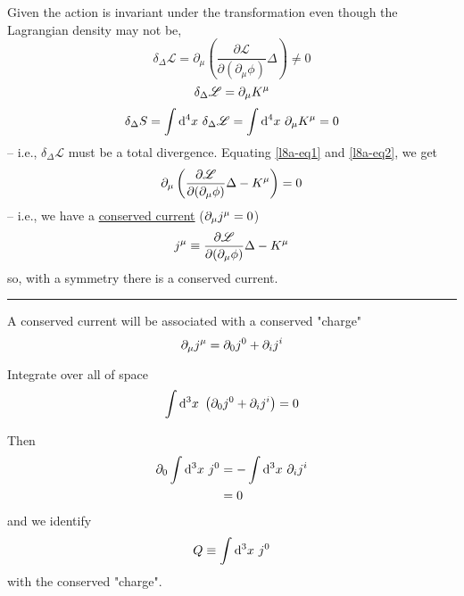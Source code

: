 \documentclass{article}
\begin{document}
\noindent Given the action is invariant under the transformation even though the \linebreak Lagrangian density may not be,
\begin{equation} \label{l8a-eq1}
    \delta_\Delta \mathscr{L} = \partial_\mu \left( \dfrac{ \partial \mathscr{L} }{ \partial ( \partial_\mu \phi ) } \Delta \right) \neq 0
\end{equation} %
\begin{equation} \label{l8a-eq2}
    \delta_\Delta \mathscr{L} = \partial_\mu \tensor{K}{^\mu}
\end{equation} %
\begin{equation*}
    \delta_\Delta S = \int \mathrm{d}^4 x~ \delta_\Delta \mathscr{L} = \int \mathrm{d}^4 x~ \partial_\mu \tensor{K}{^\mu} = 0
\end{equation*}
-- i.e., $\delta_\Delta \mathscr{L}$ must be a total divergence. Equating \eqref{l8a-eq1} and \eqref{l8a-eq2}, we get
\begin{equation*}
    \partial_\mu \left( \dfrac{ \partial \mathscr{L} }{ \partial ( \partial_\mu \phi ) } \Delta - \tensor{K}{^\mu} \right) = 0
\end{equation*}
-- i.e., we have a \underline{conserved current} ($\partial_\mu \tensor{j}{^\mu} = 0$)
\begin{equation*}
    \tensor{j}{^\mu} \equiv \dfrac{ \partial \mathscr{L} }{ \partial ( \partial_\mu \phi ) } \Delta - \tensor{K}{^\mu}
\end{equation*}
so, with a symmetry there is a conserved current.


\noindent\rule{\textwidth}{.5pt}

\noindent A conserved current will be associated with a conserved "charge"
\begin{equation*}
    \partial_\mu \tensor{j}{^\mu} = \partial_0 \tensor{j}{^0} + \partial_i \tensor{j}{^i}
\end{equation*}

\noindent Integrate over all of space
\begin{equation*}
    \int \mathrm{d}^3 x~ \left( \partial_0 \tensor{j}{^0} + \partial_i \tensor{j}{^i} \right) = 0
\end{equation*}

\noindent Then
\begin{align*}
    \partial_0 \int \mathrm{d}^3 x~ \tensor{j}{^0} &= - \int \mathrm{d}^3 x~ \partial_i \tensor{j}{^i} \\
    &= 0
\end{align*}
and we identify
\begin{equation*}
    Q \equiv \int \mathrm{d}^3 x~ \tensor{j}{^0}
\end{equation*}
with the conserved "charge".
\end{document}
